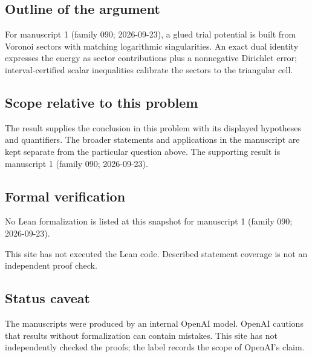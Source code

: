 \documentclass[11pt]{article}
\begin{document}
\subsection{Outline of the argument}
For manuscript 1 (family 090; 2026-09-23), a glued trial potential is built from Voronoi sectors with matching logarithmic singularities. An exact dual identity expresses the energy as sector contributions plus a nonnegative Dirichlet error; interval-certified scalar inequalities calibrate the sectors to the triangular cell.

\subsection{Scope relative to this problem}
The result supplies the conclusion in this problem with its displayed hypotheses and quantifiers. The broader statements and applications in the manuscript are kept separate from the particular question above. The supporting result is manuscript 1 (family 090; 2026-09-23).

\subsection{Formal verification}
No Lean formalization is listed at this snapshot for manuscript 1 (family 090; 2026-09-23).

This site has not executed the Lean code. Described statement coverage is not an independent proof check.

\subsection{Status caveat}
The manuscripts were produced by an internal OpenAI model. OpenAI cautions that results without formalization can contain mistakes. This site has not independently checked the proofs; the label records the scope of OpenAI's claim.
\end{document}
